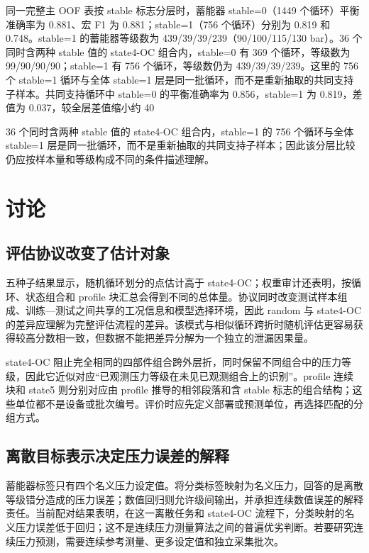 \documentclass[UTF8,12pt,a4paper]{ctexart}
\begin{document}
同一完整主 OOF 表按 stable 标志分层时，蓄能器 stable=0（1449 个循环）平衡准确率为 0.881、宏 F1 为 0.881；stable=1（756 个循环）分别为 0.819 和 0.748。stable=1 的蓄能器等级数为 439/39/39/239（90/100/115/130 bar）。36 个同时含两种 stable 值的 state4-OC 组合内，stable=0 有 369 个循环，等级数为 99/90/90/90；stable=1 有 756 个循环，等级数仍为 439/39/39/239。这里的 756 个 stable=1 循环与全体 stable=1 层是同一批循环，而不是重新抽取的共同支持子样本。共同支持循环中 stable=0 的平衡准确率为 0.856，stable=1 为 0.819，差值为 0.037，较全层差值缩小约 40%

36 个同时含两种 stable 值的 state4-OC 组合内，stable=1 的 756 个循环与全体 stable=1 层是同一批循环，而不是重新抽取的共同支持子样本；因此该分层比较仍应按样本量和等级构成不同的条件描述理解。

\section{讨论}
\subsection{评估协议改变了估计对象}
五种子结果显示，随机循环划分的点估计高于 state4-OC；权重审计还表明，按循环、状态组合和 profile 块汇总会得到不同的总体量。协议同时改变测试样本组成、训练—测试之间共享的工况信息和模型选择环境，因此 random 与 state4-OC 的差异应理解为完整评估流程的差异。该模式与相似循环跨折时随机评估更容易获得较高分数相一致，但数据不能把差异分解为一个独立的泄漏因果量。

state4-OC 阻止完全相同的四部件组合跨外层折，同时保留不同组合中的压力等级，因此它近似对应“已观测压力等级在未见已观测组合上的识别”。profile 连续块和 state5 则分别对应由 profile 推导的相邻段落和含 stable 标志的组合结构；这些单位都不是设备或批次编号。评价时应先定义部署或预测单位，再选择匹配的分组方式。

\subsection{离散目标表示决定压力误差的解释}
蓄能器标签只有四个名义压力设定值。将分类标签映射为名义压力，回答的是离散等级错分造成的压力误差；数值回归则允许级间输出，并承担连续数值误差的解释责任。当前配对结果表明，在这一离散任务和 state4-OC 流程下，分类映射的名义压力误差低于回归；这不是连续压力测量算法之间的普遍优劣判断。若要研究连续压力预测，需要连续参考测量、更多设定值和独立采集批次。
\end{document}
